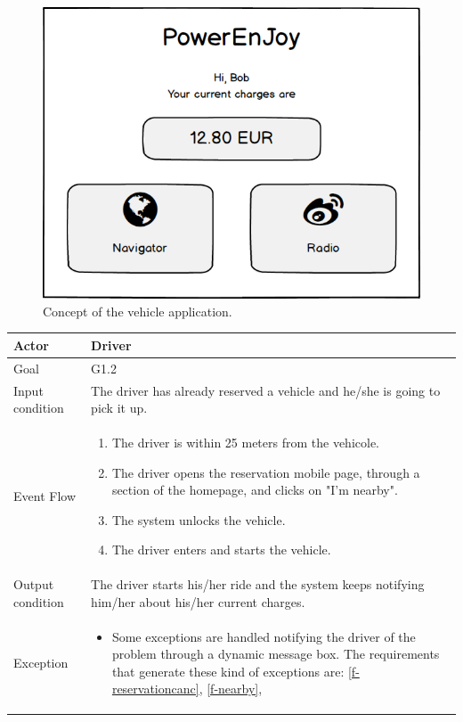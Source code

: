 \begin{figure}[H]
	\centering
	\includegraphics[width=\textwidth]{mockup/VehicleApplication.png}
	\caption{Concept of the vehicle application.}
\end{figure}

\begin{table}[H]
	\begin{center}
		\begin{tabular}{| l | p{} |}
			\hline
			Actor & Driver \\
			\hline
			Goal & G1.2
			\\
			\hline
			Input condition & The driver has already reserved a vehicle and he/she is going to pick it up.  \\
			\hline
			Event Flow & \begin{enumerate}
				\item The driver is within 25 meters from the vehicole.
				\item The driver opens the reservation mobile page, through a section of the homepage, and clicks on "I'm nearby".
				\item The system unlocks the vehicle.
				\item The driver enters and starts the vehicle. 
			\end{enumerate}
			\\
			\hline
			Output condition & The driver starts his/her ride and the system keeps notifying him/her about his/her current charges. \\
			\hline
			
			Exception &  \begin{itemize}
				\item Some exceptions are handled notifying the driver of the problem through a dynamic message box.				
				The requirements that generate these kind of exceptions are:
				\ref{f-reservationcanc},    %
				\ref{f-nearby},    %
			\end{itemize}
			\\
			\hline
		\end{tabular}
	\end{center}
\end{table}

